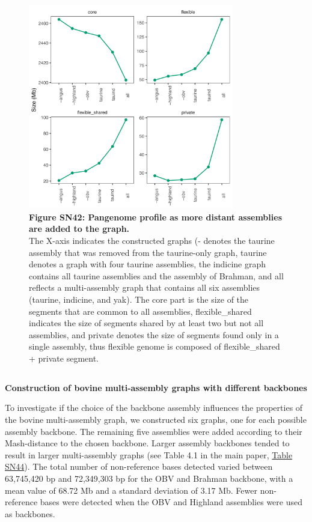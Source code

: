 \documentclass[../main.tex]{subfiles}
\begin{document}
\begin{flushleft}
\bigskip
\begin{figure}[!htb]
    \centering
    \includegraphics[width=0.8\textwidth]{paper3/supplement/sp416.pdf}
    \caption*{\textbf{\hypertarget{Figure SN42}{Figure SN42}: Pangenome profile as more distant assemblies are added to the graph.} \\
    \footnotesize{The X-axis indicates the constructed graphs (- denotes the taurine assembly that was removed from the taurine-only graph, taurine denotes a graph with four taurine assemblies, the indicine graph contains all taurine assemblies and the assembly of Brahman, and all reflects a multi-assembly graph that contains all six assemblies (taurine, indicine, and yak). The core part is the size of the segments that are common to all assemblies, flexible\_shared indicates the size of segments shared by at least two but not all assemblies, and private denotes the size of segments found only in a single assembly, thus flexible genome is composed of flexible\_shared + private segment.}}
\end{figure}

\clearpage

\subsection{}
\label{sup_not:s43}
\textbf{Construction of bovine multi-assembly graphs with different backbones}
\bigskip

To investigate if the choice of the backbone assembly influences the properties of the bovine multi-assembly graph, we constructed six graphs, one for each possible assembly backbone. The remaining five assemblies were added according to their Mash-distance to the chosen backbone. Larger assembly backbones tended to result in larger multi-assembly graphs (see Table 4.1 in the main paper, \hyperlink{Table SN44}{Table SN44}). The total number of non-reference bases detected varied between 63,745,420 bp and 72,349,303 bp for the OBV and Brahman backbone, with a mean value of 68.72 Mb and a standard deviation of 3.17 Mb. Fewer non-reference bases were detected when the OBV and Highland assemblies were used as backbones.
\bigskip


\end{flushleft}
\end{document}
